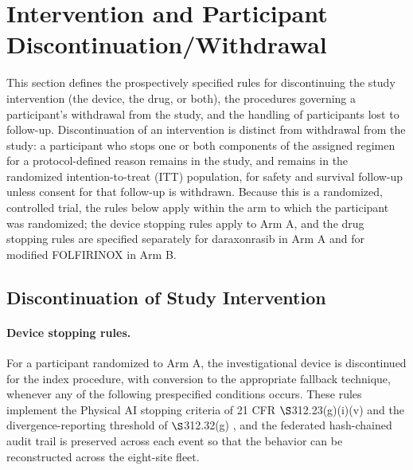 \section{Intervention and Participant Discontinuation/Withdrawal}

This section defines the prospectively specified rules for discontinuing the study
intervention (the device, the drug, or both), the procedures governing a
participant's withdrawal from the study, and the handling of participants lost to
follow-up. Discontinuation of an intervention is distinct from withdrawal from the
study: a participant who stops one or both components of the assigned regimen for a
protocol-defined reason remains in the study, and remains in the randomized
intention-to-treat (ITT) population, for safety and survival follow-up unless
consent for that follow-up is withdrawn. Because this is a randomized, controlled
trial, the rules below apply within the arm to which the participant was
randomized; the device stopping rules apply to Arm A, and the drug stopping rules
are specified separately for daraxonrasib in Arm A and for modified FOLFIRINOX in
Arm B.

\subsection{Discontinuation of Study Intervention}

\paragraph{Device stopping rules.}
For a participant randomized to Arm A, the investigational device is discontinued
for the index procedure, with conversion to the appropriate fallback technique,
whenever any of the following prespecified conditions occurs. These rules implement
the Physical AI stopping criteria of 21 CFR $\S$312.23(g)(i)(v) and the
divergence-reporting threshold of $\S$312.32(g) \cite{kawchak2026adapt312}, and the
federated hash-chained audit trail is preserved across each event so that the
behavior can be reconstructed across the eight-site fleet.

